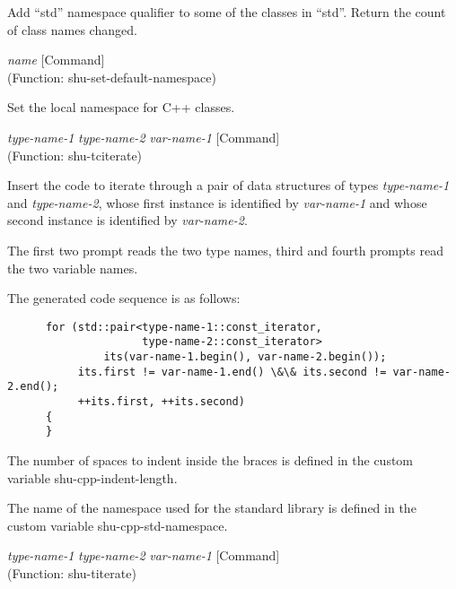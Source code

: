 \begin{doc-string}
Add ``std'' namespace qualifier to some of the classes in ``std''.  Return the
count of class names changed.
\end{doc-string}

\vspace{1em}
\noindent
{}
\usebox{\funcname}\emph{name}
 \hfill [Command]\\%
 (Function: shu-set-default-namespace)

\begin{doc-string}
Set the local namespace for C++ classes.
\end{doc-string}

\vspace{1em}
\noindent
{}
\usebox{\funcname}\emph{type-name-1} \emph{type-name-2} \emph{var-name-1}
 \hfill [Command]
\hspace*{\wd\funcname}\\%
 (Function: shu-tciterate)

\begin{doc-string}
Insert the code to iterate through a pair of data structures of types
\emph{type-name-1} and \emph{type-name-2}, whose first instance is identified by \emph{var-name-1}
and whose second instance is identified by \emph{var-name-2}.

The first two prompt reads the two type names, third and fourth prompts read the
two variable names.

The generated code sequence is as follows:

\small{\begin{verbatim}
      for (std::pair<type-name-1::const_iterator,
                     type-name-2::const_iterator>
               its(var-name-1.begin(), var-name-2.begin());
           its.first != var-name-1.end() \&\& its.second != var-name-2.end();
           ++its.first, ++its.second)
      {
      }
\end{verbatim}}

The number of spaces to indent inside the braces is defined in the custom
variable shu-cpp-indent-length.

The name of the namespace used for the standard library is defined in the custom
variable shu-cpp-std-namespace.
\end{doc-string}

\vspace{1em}
\noindent
{}
\usebox{\funcname}\emph{type-name-1} \emph{type-name-2} \emph{var-name-1}
 \hfill [Command]
\hspace*{\wd\funcname}\\%
 (Function: shu-titerate)

